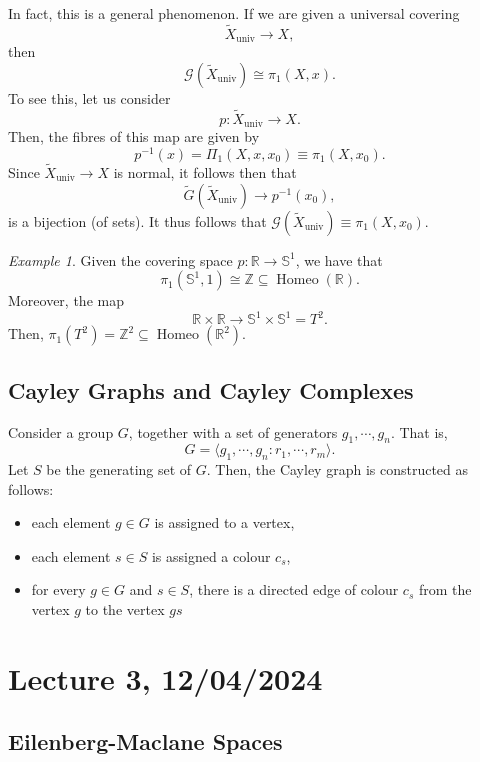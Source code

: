 \documentclass[a4paper]{report}
\theoremstyle{definition}
\theoremstyle{remark}
\theoremstyle{proposition}
\theoremstyle{conjecture}
\theoremstyle{lemma}
\theoremstyle{corollary}
\theoremstyle{exercise}
\newtheorem{example}{Example}
\newcommand{\mcal}{\mathcal}
\newcommand{\on}{\operatorname}
\begin{document}
In fact, this is a general phenomenon. If we are given a universal covering 
$$\widetilde{X}_{\on{univ}} \longrightarrow X,$$ then 
$$\mcal{G}(\widetilde{X}_{\on{univ}}) \cong \pi_1(X,x).$$
To see this, let us consider 
$$p : \widetilde{X}_{\on{univ}} \longrightarrow X.$$
Then, the fibres of this map are given by 
$$p^{-1}(x) = \Pi_1(X,x,x_0) \equiv \pi_1(X,x_0).$$ 
Since $\widetilde{X}_{\on{univ}} \to X$ is normal, it follows then that 
$$\widetilde{G}(\widetilde{X}_{\on{univ}}) \longrightarrow p^{-1}(x_0),$$ is a bijection 
(of sets). It thus follows that 
$\mcal{G}(\widetilde{X}_{\on{univ}}) \equiv \pi_1(X,x_0)$.

\begin{example}
    Given the covering space $p : \mathbb{R} \to \mathbb{S}^1$, we have that 
    $$\pi_1(\mathbb{S}^1,1) \cong \mathbb{Z} \subseteq \on{Homeo}(\mathbb{R}).$$
    Moreover, the map 
    $$\mathbb{R} \times \mathbb{R} \longrightarrow \mathbb{S}^1 \times \mathbb{S}^1 = T^2.$$ 
    Then, $\pi_1(T^2) = \mathbb{Z}^2 \subseteq \on{Homeo}(\mathbb{R}^2)$.
\end{example}

\subsection{Cayley Graphs and Cayley Complexes}

Consider a group $G$, together with a set of generators $g_1,\cdots, g_n$. 
That is, $$G = \langle g_1,\cdots, g_n : r_1,\cdots, r_m\rangle.$$
Let $S$ be the generating set of $G$. Then, the Cayley graph is constructed as follows:
\begin{itemize}
    \item each element $g\in G$ is assigned to a vertex, 
    \item each element $s \in S$ is assigned a colour $c_s$,
    \item for every $g\in G$ and $s \in S$, there is a directed edge of colour $c_s$ from the vertex
    $g$ to the vertex $gs$
\end{itemize}

\section{Lecture 3, 12/04/2024}

\subsection{Eilenberg-Maclane Spaces}
\end{document}
